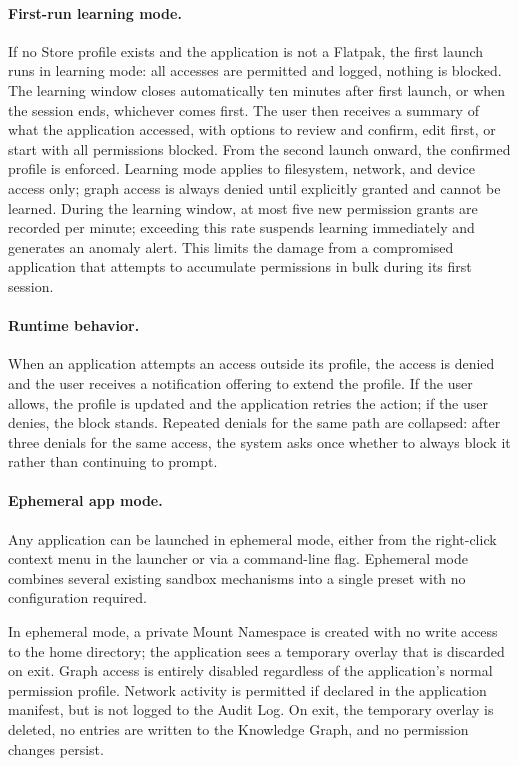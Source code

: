 \paragraph{First-run learning mode.}
If no Store profile exists and the application is not a Flatpak, the first
launch runs in learning mode: all accesses are permitted and logged, nothing is
blocked. The learning window closes automatically ten minutes after first
launch, or when the session ends, whichever comes first. The user then receives
a summary of what the application accessed, with options to review and confirm,
edit first, or start with all permissions blocked. From the second launch
onward, the confirmed profile is enforced. Learning mode applies to filesystem,
network, and device access only; graph access is always denied until explicitly
granted and cannot be learned. During the learning window, at most five new
permission grants are recorded per minute; exceeding this rate suspends
learning immediately and generates an anomaly alert. This limits the damage
from a compromised application that attempts to accumulate permissions in bulk
during its first session.

\paragraph{Runtime behavior.}
When an application attempts an access outside its profile, the access is
denied and the user receives a notification offering to extend the profile.
If the user allows, the profile is updated and the application retries the
action; if the user denies, the block stands. Repeated denials for the same
path are collapsed: after three denials for the same access, the system asks
once whether to always block it rather than continuing to prompt.

\paragraph{Ephemeral app mode.}
Any application can be launched in ephemeral mode, either from the right-click
context menu in the launcher or via a command-line flag. Ephemeral mode
combines several existing sandbox mechanisms into a single preset with no
configuration required.

In ephemeral mode, a private Mount Namespace is created with no write access
to the home directory; the application sees a temporary overlay that is
discarded on exit. Graph access is entirely disabled regardless of the
application's normal permission profile. Network activity is permitted if
declared in the application manifest, but is not logged to the Audit Log.
On exit, the temporary overlay is deleted, no entries are written to the
Knowledge Graph, and no permission changes persist.


